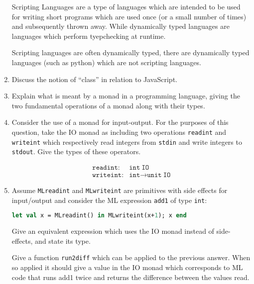 \documentclass[10pt,\jkfside,a4paper]{article}
\begin{document}
\begin{enumerate}
Scripting Languages are a type of languages which are intended to be used
for writing short programs which are used once (or a small number of times)
and subsequently thrown away. While dynamically typed languages are
languages which perform tyepchecking at runtime.

Scripting languages are often dynamically typed, there are dynamically
typed languages (such as python) which are not scripting languages.

\item Discuss the notion of ``class'' in relation to JavaScript.


\item Explain what is meant by a monad in a programming language, giving
the two fundamental operations of a monad along with their types.


\item Consider the use of a monad for input-output. For the purposes of this
question, take the IO monad as including two operations \texttt{readint} and
\texttt{writeint} which respectively read integers from \texttt{stdin} and
write integers to \texttt{stdout}. Give the types of these operators.

\begin{align}
\texttt{readint}:& \texttt{int}\ \texttt{IO}\\
\texttt{writeint}:& \texttt{int} \to \texttt{unit}\ \texttt{IO}
\end{align}

\item Assume \texttt{MLreadint} and \texttt{MLwriteint} are primitives with
side effects for input/output and consider the ML expression \texttt{add1}
of type \texttt{int}:

\begin{lstlisting}[language=ml]
let val x = MLreadint() in MLwriteint(x+1); x end
\end{lstlisting}

Give an equivalent expression which uses the IO monad instead of
side-effects, and state its type.


Give a function \texttt{run2diff} which can be applied to the previous
answer. When so applied it should give a value in the IO monad which
corresponds to ML code that runs add1 twice and returns the difference
between the values read.



\end{enumerate}
\end{document}

